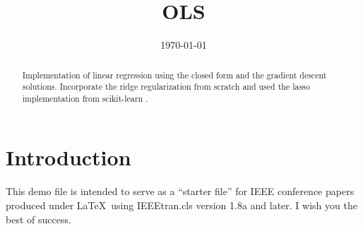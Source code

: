 \documentclass[conference]{IEEEtran}
\date{\today}
\begin{document}
%
\title{OLS}


\author{
\and
{}
\and
{}
}



\maketitle

\begin{abstract}
  Implementation of linear regression using the closed form and the
  gradient descent solutions. Incorporate the ridge regularization from scratch
  and used the lasso implementation from scikit-learn \cite{scikit-learn}.
\end{abstract}





\IEEEpeerreviewmaketitle



\section{Introduction}
This demo file is intended to serve as a ``starter file''
for IEEE conference papers produced under \LaTeX\ using
IEEEtran.cls version 1.8a and later.
I wish you the best of success.
\end{document}
